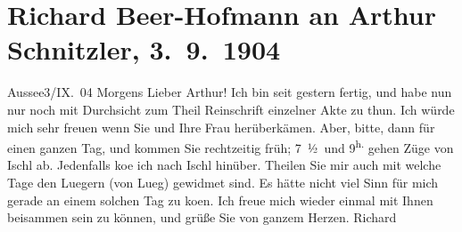 

         
         \newcommand{\erwaehntePersonen}{Personen: Olga Schnitzler}
         \newcommand{\erwaehnteInstitutionen}{}
         \newcommand{\erwaehnteOrte}{Orte: Bad Aussee, Bad Ischl, Lueg am Wolfgangsee}
         \newcommand{\erwaehnteWerke}{Werke: Der Graf von Charolais. Ein Trauerspiel}
               \section[Richard Beer-Hofmann an Arthur Schnitzler, 3. 9. 1904]{ Richard Beer-Hofmann an Arthur Schnitzler, 3. 9. 1904}\nopagebreak{}\rehead{ }\begin{ledgroupsized}[t]{13cm}\normalsize\beginnumbering \toendnotes[C]{\smallbreak\pagebreak[2]} 
\toendnotes[C]{\smallbreak}\pstart
           \centering{}{\pb}Aussee3/IX. 04{ }Morgens\pend
           \pstart
           Lieber Arthur! Ich bin seit gestern fertig, und habe nun nur noch
               mit Durchsicht zum Theil Reinschrift einzelner Akte zu thun. Ich würde mich sehr freuen wenn Sie und Ihre
                  Frau herüberkämen. Aber, bitte, dann für einen
               ganzen Tag, und kommen Sie rechtzeitig früh; 7 ½ und 9\textsuperscript{h.} gehen Züge von Ischl ab. Jedenfalls ko{\geminationm}e ich nach Ischl
               hinüber. Theilen Sie mir auch mit welche Tage den Luegern (von Lueg) gewidmet sind. Es hätte
               nicht viel Sinn für mich gerade an einem solchen Tag zu ko{\geminationm}en.\pend
           \pstart
           Ich freue mich wieder einmal mit Ihnen beisammen sein zu können, und grüße Sie von
               ganzem Herzen.\pend
           \pstart \spacefill\mbox{Richard}\pend{}
         
         \endnumbering{}\end{ledgroupsized}  \newcommand{\dateiname}{L01434}\newcommand{\titel}{Richard Beer-Hofmann an Arthur Schnitzler, 3. 9. 1904}\newcommand{\editorInnen}{Martin Anton Müller und Gerd-Hermann Susen}
      